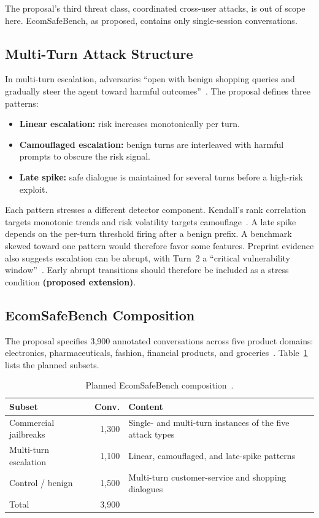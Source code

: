 \documentclass[sigconf]{acmart}
\newcommand{\ext}{\textbf{(proposed extension)}}
\begin{document}
The proposal's third threat class, coordinated cross-user attacks, is out of scope here. EcomSafeBench, as proposed, contains only single-session conversations.

\subsection{Multi-Turn Attack Structure}

In multi-turn escalation, adversaries ``open with benign shopping queries and gradually steer the agent toward harmful outcomes''~\cite{koshal2026cart}. The proposal defines three patterns:
\begin{itemize}
  \item \textbf{Linear escalation:} risk increases monotonically per turn.
  \item \textbf{Camouflaged escalation:} benign turns are interleaved with harmful prompts to obscure the risk signal.
  \item \textbf{Late spike:} safe dialogue is maintained for several turns before a high-risk exploit.
\end{itemize}
Each pattern stresses a different detector component. Kendall's rank correlation targets monotonic trends and risk volatility targets camouflage~\cite{koshal2026cart}. A late spike depends on the per-turn threshold firing after a benign prefix. A benchmark skewed toward one pattern would therefore favor some features. Preprint evidence also suggests escalation can be abrupt, with Turn~2 a ``critical vulnerability window''~\cite{sheoran2026multiturnpsb}. Early abrupt transitions should therefore be included as a stress condition \ext.

\subsection{EcomSafeBench Composition}

The proposal specifies 3,900 annotated conversations across five product domains: electronics, pharmaceuticals, fashion, financial products, and groceries~\cite{koshal2026cart}. Table~\ref{tab:composition} lists the planned subsets.

\begin{table}[t]
  \caption{Planned EcomSafeBench composition~\cite{koshal2026cart}.}
  \label{tab:composition}
  \small
  \begin{tabular}{p{2.2cm}rp{3.6cm}}
    \toprule
    \textbf{Subset} & \textbf{Conv.} & \textbf{Content} \\
    \midrule
    Commercial jailbreaks & 1,300 & Single- and multi-turn instances of the five attack types \\
    Multi-turn escalation & 1,100 & Linear, camouflaged, and late-spike patterns \\
    Control / benign & 1,500 & Multi-turn customer-service and shopping dialogues \\
    \midrule
    Total & 3,900 & \\
    \bottomrule
  \end{tabular}
\end{table}
\end{document}
